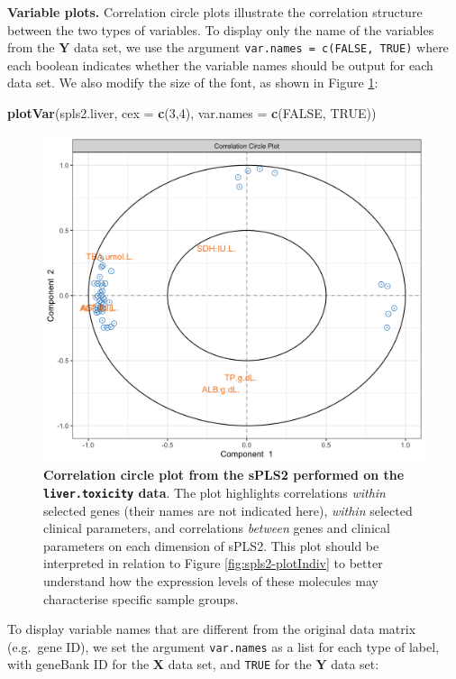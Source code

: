 \documentclass[]{book}
\newenvironment{Shaded}{\begin{snugshade}}{\end{snugshade}}
\newcommand{\DataTypeTok}[1]{\textcolor[rgb]{0.13,0.29,0.53}{#1}}
\newcommand{\DecValTok}[1]{\textcolor[rgb]{0.00,0.00,0.81}{#1}}
\newcommand{\KeywordTok}[1]{\textcolor[rgb]{0.13,0.29,0.53}{\textbf{#1}}}
\newcommand{\NormalTok}[1]{#1}
\newcommand{\OtherTok}[1]{\textcolor[rgb]{0.56,0.35,0.01}{#1}}
\begin{document}
\textbf{Variable plots.}
Correlation circle plots illustrate the correlation structure between the two types of variables. To display only the name of the variables from the \(\boldsymbol{Y}\) data set, we use the argument \texttt{var.names\ =\ c(FALSE,\ TRUE)} where each boolean indicates whether the variable names should be output for each data set. We also modify the size of the font, as shown in Figure \ref{fig:spls2-plotVar}:

\begin{Shaded}
\begin{Highlighting}[]
\KeywordTok{plotVar}\NormalTok{(spls2.liver, }\DataTypeTok{cex =} \KeywordTok{c}\NormalTok{(}\DecValTok{3}\NormalTok{,}\DecValTok{4}\NormalTok{), }\DataTypeTok{var.names =} \KeywordTok{c}\NormalTok{(}\OtherTok{FALSE}\NormalTok{, }\OtherTok{TRUE}\NormalTok{))}
\end{Highlighting}
\end{Shaded}

\begin{figure}

{\centering \includegraphics[width=0.5\linewidth]{Figures/PLS/spls2-plotVar-1} 

}

\caption{\textbf{Correlation circle plot from the sPLS2 performed on the \texttt{liver.toxicity} data}. The plot highlights correlations \emph{within} selected genes (their names are not indicated here), \emph{within} selected clinical parameters, and correlations \emph{between} genes and clinical parameters on each dimension of sPLS2. This plot should be interpreted in relation to Figure \ref{fig:spls2-plotIndiv} to better understand how the expression levels of these molecules may characterise specific sample groups.}\label{fig:spls2-plotVar}
\end{figure}



To display variable names that are different from the original data matrix (e.g.~gene ID), we set the argument \texttt{var.names} as a list for each type of label, with geneBank ID for the \(\boldsymbol X\) data set, and \texttt{TRUE} for the \(\boldsymbol Y\) data set:
\end{document}
